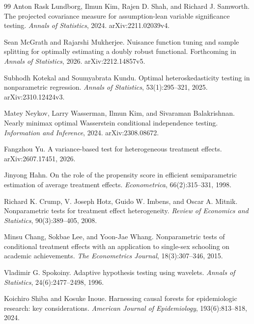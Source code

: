 \documentclass{article}
\begin{document}
\begin{thebibliography}{99}
   Anton Rask Lundborg, Ilmun Kim, Rajen D. Shah, and Richard J. Samworth. The projected covariance measure for assumption-lean variable significance testing. \emph{Annals of Statistics}, 2024. arXiv:2211.02039v4.

   Sean McGrath and Rajarshi Mukherjee. Nuisance function tuning and sample splitting for optimally estimating a doubly robust functional. Forthcoming in \emph{Annals of Statistics}, 2026. arXiv:2212.14857v5.

   Subhodh Kotekal and Soumyabrata Kundu. Optimal heteroskedasticity testing in nonparametric regression. \emph{Annals of Statistics}, 53(1):295--321, 2025. arXiv:2310.12424v3.

   Matey Neykov, Larry Wasserman, Ilmun Kim, and Sivaraman Balakrishnan. Nearly minimax optimal Wasserstein conditional independence testing. \emph{Information and Inference}, 2024. arXiv:2308.08672.

   Fangzhou Yu. A variance-based test for heterogeneous treatment effects. arXiv:2607.17451, 2026.

   Jinyong Hahn. On the role of the propensity score in efficient semiparametric estimation of average treatment effects. \emph{Econometrica}, 66(2):315--331, 1998.

   Richard K. Crump, V. Joseph Hotz, Guido W. Imbens, and Oscar A. Mitnik. Nonparametric tests for treatment effect heterogeneity. \emph{Review of Economics and Statistics}, 90(3):389--405, 2008.

   Minsu Chang, Sokbae Lee, and Yoon-Jae Whang. Nonparametric tests of conditional treatment effects with an application to single-sex schooling on academic achievements. \emph{The Econometrics Journal}, 18(3):307--346, 2015.

   Vladimir G. Spokoiny. Adaptive hypothesis testing using wavelets. \emph{Annals of Statistics}, 24(6):2477--2498, 1996.

   Koichiro Shiba and Kosuke Inoue. Harnessing causal forests for epidemiologic research: key considerations. \emph{American Journal of Epidemiology}, 193(6):813--818, 2024.

\end{thebibliography}
\end{document}
